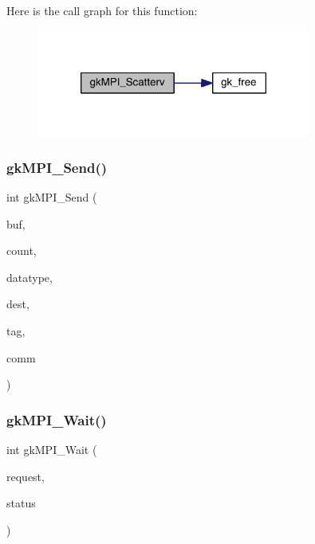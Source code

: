 Here is the call graph for this function\+:\nopagebreak
\begin{figure}[H]
\begin{center}
\leavevmode
\includegraphics[width=254pt]{a00359_a08990d66eed081828d6addc2e5affde3_cgraph}
\end{center}
\end{figure}
\mbox{\label{a00359_a2442b8eee4afc113918cd7a5878244b6}} 
\subsubsection{\texorpdfstring{gk\+M\+P\+I\+\_\+\+Send()}{gkMPI\_Send()}}
{\footnotesize\ttfamily int gk\+M\+P\+I\+\_\+\+Send (\begin{DoxyParamCaption}\item[{void $\ast$}]{buf,  }\item[{\hyperlink{a00876_aaa5262be3e700770163401acb0150f52}{idx\+\_\+t}}]{count,  }\item[{M\+P\+I\+\_\+\+Datatype}]{datatype,  }\item[{\hyperlink{a00876_aaa5262be3e700770163401acb0150f52}{idx\+\_\+t}}]{dest,  }\item[{\hyperlink{a00876_aaa5262be3e700770163401acb0150f52}{idx\+\_\+t}}]{tag,  }\item[{M\+P\+I\+\_\+\+Comm}]{comm }\end{DoxyParamCaption})}

\mbox{\label{a00359_a878d900addb2e537070c9892cc37dde0}} 
\subsubsection{\texorpdfstring{gk\+M\+P\+I\+\_\+\+Wait()}{gkMPI\_Wait()}}
{\footnotesize\ttfamily int gk\+M\+P\+I\+\_\+\+Wait (\begin{DoxyParamCaption}\item[{M\+P\+I\+\_\+\+Request $\ast$}]{request,  }\item[{M\+P\+I\+\_\+\+Status $\ast$}]{status }\end{DoxyParamCaption})}

